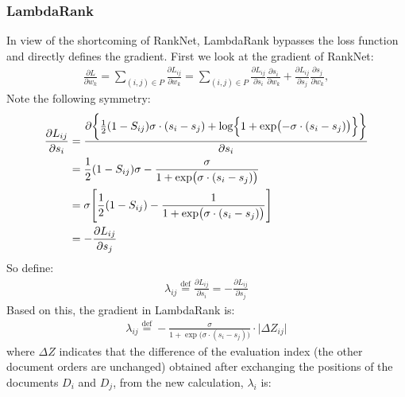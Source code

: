 \subsubsection{LambdaRank}
In view of the shortcoming of RankNet, LambdaRank bypasses the loss function and directly defines the gradient. First we look at the gradient of RankNet:
\begin{equation}
\begin{aligned}
\frac{\partial L}{\partial w_k} =
    \sum_{(i, j) \in P}\frac{\partial L_{ij}}{\partial w_k} =
    \sum_{(i, j) \in P}
        \frac{\partial L_{ij}}{\partial s_i}\frac{\partial s_i}{\partial w_k}
            +
        \frac{\partial L_{ij}}{\partial s_j}\frac{\partial s_j}{\partial w_k},
\end{aligned}
\label{eqn:eq10}
\end{equation}
Note the following symmetry:
\begin{equation}
\begin{aligned}
\frac{\partial L_{ij}}{\partial s_i} & {} = \frac{\partial \biggl\{\frac12 (1 - S_{ij})\sigma\cdot(s_i - s_j) + \log\Bigl\{1 + \exp\bigl(-\sigma\cdot(s_i - s_j)\bigr)\Bigr\}\biggr\}}{\partial s_i}\\
 & {}= \frac12 (1 - S_{ij})\sigma - \frac{\sigma}{1 + \exp\bigl(\sigma\cdot(s_i - s_j)\bigr)} \\
 & {}= \sigma\Biggl[\frac12(1 - S_{ij}) - \frac{1}{1 + \exp\bigl(\sigma\cdot(s_i - s_j)\bigr)}\Biggr] \\
 & {}= -\frac{\partial L_{ij}}{\partial s_j}
\end{aligned}
\label{eqn:eq11}
\end{equation}
So define:
\begin{equation}
\begin{aligned}
\lambda_{ij}\mathrel{\stackrel{\mbox{def}}{=}} \frac{\partial L_{ij}}{\partial s_i} = -\frac{\partial L_{ij}}{\partial s_j}
\end{aligned}
\label{eqn:eq12}
\end{equation}
Based on this, the gradient in LambdaRank is:
\begin{equation}
\begin{aligned}
\lambda_{ij}\mathrel{\stackrel{\mbox{def}}{=}} - \frac{\sigma}{1 + \exp\bigl(\sigma\cdot(s_i - s_j)\bigr)}\cdot\lvert\Delta Z_{ij}\rvert
\end{aligned}
\label{eqn:eq13}
\end{equation}
where  $\Delta Z$ indicates that the difference of the evaluation index (the other document orders are unchanged) obtained after exchanging the positions of the documents $D_i$ and $D_j$, from the new calculation, $\lambda_i$ is:
